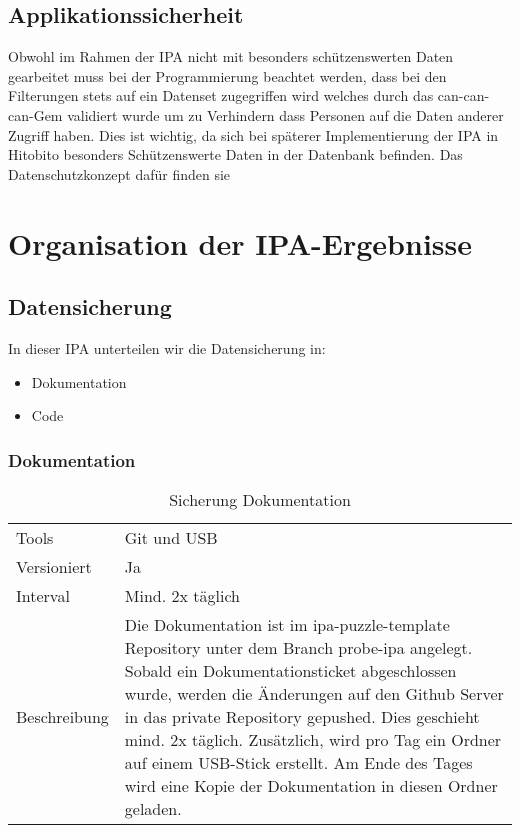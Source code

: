 \section{Applikationssicherheit}
Obwohl im Rahmen der IPA nicht mit besonders schützenswerten Daten gearbeitet muss bei der Programmierung beachtet werden,
dass bei den Filterungen stets auf ein Datenset zugegriffen wird welches durch das can-can-can-Gem validiert wurde um zu
Verhindern dass Personen auf die Daten anderer Zugriff haben. Dies ist wichtig, da sich bei späterer Implementierung der IPA in 
Hitobito besonders Schützenswerte Daten in der Datenbank befinden. Das Datenschutzkonzept dafür finden sie

\chapter{Organisation der IPA-Ergebnisse}

\section{Datensicherung}
In dieser IPA unterteilen wir die Datensicherung in:

\begin{itemize}
\item Dokumentation
\item Code
\end{itemize}

\subsection{Dokumentation}
\begin{table}[h!]
      \begin{tabular}{|L{0.4\textwidth}|L{0.5\textwidth}|}
          \hline
            \\[12pt]
          \hline
          Tools & Git und USB \\
          \hline
          Versioniert & Ja \\
          \hline
          Interval & Mind. 2x täglich \\
          \hline
          Beschreibung & Die Dokumentation ist im ipa-puzzle-template Repository unter dem Branch probe-ipa angelegt.
          Sobald ein Dokumentationsticket abgeschlossen wurde, werden die Änderungen auf den Github Server in das private Repository
          gepushed. Dies geschieht mind. 2x täglich. Zusätzlich, wird pro Tag ein Ordner auf einem USB-Stick erstellt.  Am Ende des Tages wird eine Kopie der Dokumentation
          in diesen Ordner geladen. \\
        \hline
        \end{tabular}
        \caption{Sicherung Dokumentation}
  \end{table}

